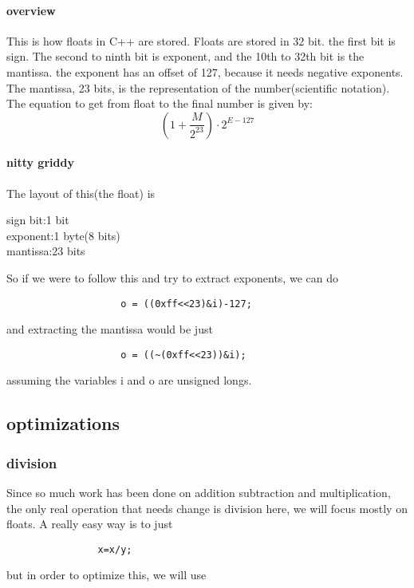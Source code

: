 \documentclass{article} %
\begin{document}
            \paragraph{overview}
                This is how floats in C++ are stored. Floats are stored in 32 bit. the first bit is sign.
                The second to ninth bit is exponent, and the 10th to 32th bit is the mantissa. the exponent has
                an offset of 127, because it needs negative exponents. The mantissa, 23 bits, is the representation of the number(scientific notation).
                The equation to get from float to the final number is given by:
                \begin{equation}
                    (1+\dfrac{M}{2^{23}})\cdot2^{E-127}
                \end{equation}
            \paragraph{nitty griddy}
                The layout of this(the float) is 
                \begin{center}
                    sign bit:1 bit\\
                    exponent:1 byte(8 bits)\\
                    mantissa:23 bits\\
                \end{center}
                So if we were to follow this and try to extract exponents, we can do
                \begin{verbatim}
                    o = ((0xff<<23)&i)-127;
                \end{verbatim}
                and extracting the mantissa would be just 
                \begin{verbatim}
                    o = ((~(0xff<<23))&i);
                \end{verbatim}
                assuming the variables i and o are unsigned longs.
    \subsection{optimizations}
        \subsubsection{division}
            Since so much work has been done on addition subtraction and multiplication, the only real operation that needs change is division
            here, we will focus mostly on floats. A really easy way is to just \begin{verbatim}
                x=x/y;
            \end{verbatim}
            but in order to optimize this, we will use 
\end{document}
